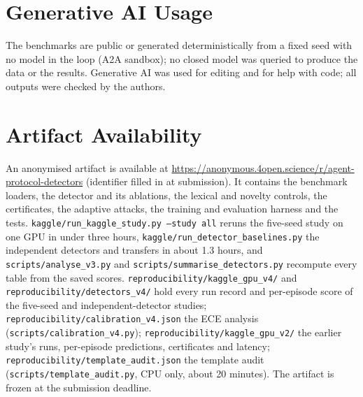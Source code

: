 \documentclass[conference,compsoc]{IEEEtran}
\begin{document}
\section{Generative AI Usage}
\label{app:genai}
The benchmarks are public or generated deterministically from a fixed seed with no model in the loop (A2A sandbox); no closed model was queried to produce the data or the results. Generative AI was used for editing and for help with code; all outputs were checked by the authors.

\section{Artifact Availability}
\label{app:artifact}
An anonymised artifact is available at \url{https://anonymous.4open.science/r/agent-protocol-detectors} (identifier filled in at submission). It contains the benchmark loaders, the detector and its ablations, the lexical and novelty controls, the certificates, the adaptive attacks, the training and evaluation harness and the tests. \texttt{kaggle/run\_kaggle\_study.py --study all} reruns the five-seed study on one GPU in under three hours, \texttt{kaggle/run\_detector\_baselines.py} the independent detectors and transfers in about 1.3 hours, and \texttt{scripts/analyse\_v3.py} and \texttt{scripts/summarise\_detectors.py} recompute every table from the saved scores. \texttt{reproducibility/kaggle\_gpu\_v4/} and \texttt{reproducibility/detectors\_v4/} hold every run record and per-episode score of the five-seed and independent-detector studies; \texttt{reproducibility/calibration\_v4.json} the ECE analysis (\texttt{scripts/calibration\_v4.py}); \texttt{reproducibility/kaggle\_gpu\_v2/} the earlier study's runs, per-episode predictions, certificates and latency; \texttt{reproducibility/template\_audit.json} the template audit (\texttt{scripts/template\_audit.py}, CPU only, about 20 minutes). The artifact is frozen at the submission deadline.
\end{document}
